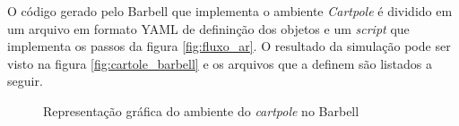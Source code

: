 \documentclass[cic,tc]{iiufrgs}
\begin{document}
O código gerado pelo Barbell que implementa o ambiente \textit{Cartpole} é
dividido em um arquivo em formato YAML de defininção dos objetos e um
\textit{script} que implementa os passos da figura \ref{fig:fluxo_ar}. O
resultado da simulação pode ser visto na figura \ref{fig:cartole_barbell} e
os arquivos que a definem são listados a seguir.

\begin{figure}[h!]
  \begin{center}
  \caption{Representação gráfica do ambiente do \textit{cartpole} no Barbell}
  \label{fig:cartpole_openai}
\end{center}
\end{figure}
\end{document}

